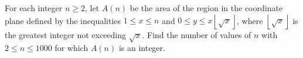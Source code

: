 For each integer $n \ge 2$, let $A(n)$ be the area of the region in the coordinate plane defined by the inequalities $1\le x \le n$ and $0\le y \le x \left\lfloor \sqrt x \right\rfloor$, where $\left\lfloor \sqrt x \right\rfloor$ is the greatest integer not exceeding $\sqrt x$. Find the number of values of $n$ with $2\le n \le 1000$ for which $A(n)$ is an integer.